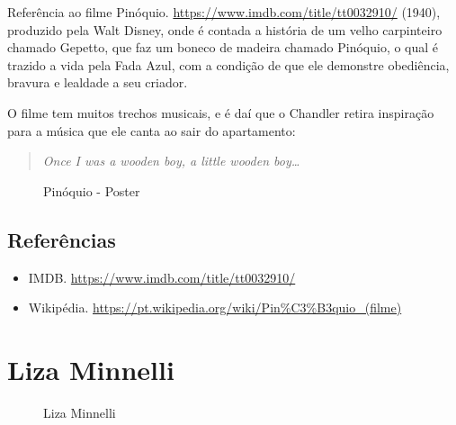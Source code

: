 Referência ao filme
\sloppy Pinóquio. \url{https://www.imdb.com/title/tt0032910/} (1940),
produzido pela Walt Disney, onde é contada a história de um velho
carpinteiro chamado Gepetto, que faz um boneco de madeira chamado
Pinóquio, o qual é trazido a vida pela Fada Azul, com a condição de que
ele demonstre obediência, bravura e lealdade a seu criador.

O filme tem muitos trechos musicais, e é daí que o Chandler retira
inspiração para a música que ele canta ao sair do apartamento:

\begin{quote}
\emph{Once I was a wooden boy, a little wooden boy\ldots{}}
\end{quote}

\begin{figure}
  \centering
    \caption{Pinóquio - Poster\label{fig:pin-quio-poster}}
\end{figure}

\hypertarget{referuxeancias-7}{%
\subsection{Referências}\label{referuxeancias-7}}

\begin{itemize}
\tightlist
\item
  \sloppy IMDB. \url{https://www.imdb.com/title/tt0032910/}
\item
  \sloppy Wikipédia. \url{https://pt.wikipedia.org/wiki/Pin%C3%B3quio_(filme)}
\end{itemize}

\hypertarget{liza-minnelli}{%
\section{Liza Minnelli}\label{liza-minnelli}}

\begin{figure}
  \centering
    \caption{Liza Minnelli\label{fig:liza-minnelli}}
\end{figure}

